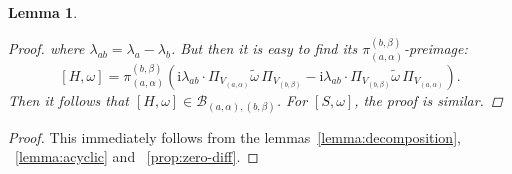 \documentclass[10pt,a4paper]{amsart}
\newtheorem{lemma}{Lemma}
\begin{document}
\begin{lemma}
\begin{proof}
    where $\lambda_{ab}=\lambda_{a}-\lambda_{b}$. But then it is easy to find its $\pi_{(a,\alpha)}^{(b,\beta)}$-preimage:
        \begin{equation}
        \label{preimage}
            [H,\omega]=\pi_{(a,\alpha)}^{(b,\beta)}(\mathrm{i}\lambda_{ab}\cdot \Pi_{V_{(a,\alpha)}}\tilde{\omega}\,\Pi_{V_{(b,\beta)}}-\mathrm{i}\lambda_{ab}\cdot\Pi_{V_{(b,\beta)}}\tilde{\omega}\,\Pi_{V_{(a,\alpha)}}).
        \end{equation}
        Then it follows that $[H,\omega]\in\mathcal{B}_{(a,\alpha),(b,\beta)}$. For $[S,\omega]$, the proof is similar.
    \end{proof}
\end{lemma}

    \begin{proof}
        This immediately follows from the lemmas~\ref{lemma:decomposition}, ~\ref{lemma:acyclic} and ~\ref{prop:zero-diff}.
    \end{proof}
\end{document}
